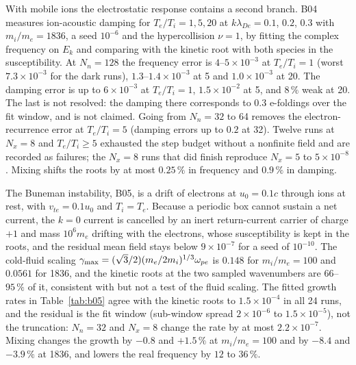 With mobile ions the electrostatic response contains a second branch. B04 measures ion-acoustic damping for $T_e/T_i=1,5,20$ at $k\lambda_{De}=0.1$, $0.2$, $0.3$ with $m_i/m_e=1836$, a seed $10^{-6}$ and the hypercollision $\nu=1$, by fitting the complex frequency on $E_k$ and comparing with the kinetic root with both species in the susceptibility. At $N_n=128$ the frequency error is $4$--$5\times10^{-3}$ at $T_e/T_i=1$ (worst $7.3\times10^{-3}$ for the dark runs), $1.3$--$1.4\times10^{-3}$ at 5 and $1.0\times10^{-3}$ at 20. The damping error is up to $6\times10^{-3}$ at $T_e/T_i=1$, $1.5\times10^{-2}$ at 5, and $8\,\%$ weak at 20. The last is not resolved: the damping there corresponds to 0.3 e-foldings over the fit window, and is not claimed. Going from $N_n=32$ to 64 removes the electron-recurrence error at $T_e/T_i=5$ (damping errors up to $0.2$ at 32). Twelve runs at $N_x=8$ and $T_e/T_i\ge5$ exhausted the step budget without a nonfinite field and are recorded as failures; the $N_x=8$ runs that did finish reproduce $N_x=5$ to $5\times10^{-8}$. Mixing shifts the roots by at most $0.25\,\%$ in frequency and $0.9\,\%$ in damping.

The Buneman instability, B05, is a drift of electrons at $u_0=0.1c$ through ions at rest, with $v_{te}=0.1u_0$ and $T_i=T_e$. Because a periodic box cannot sustain a net current, the $k=0$ current is cancelled by an inert return-current carrier of charge $+1$ and mass $10^6m_e$ drifting with the electrons, whose susceptibility is kept in the roots, and the residual mean field stays below $9\times10^{-7}$ for a seed of $10^{-10}$. The cold-fluid scaling $\gamma_{\max}=(\sqrt3/2)(m_e/2m_i)^{1/3}\omega_{pe}$ is $0.148$ for $m_i/m_e=100$ and $0.0561$ for 1836, and the kinetic roots at the two sampled wavenumbers are $66$--$95\,\%$ of it, consistent with but not a test of the fluid scaling. The fitted growth rates in Table~\ref{tab:b05} agree with the kinetic roots to $1.5\times10^{-4}$ in all 24 runs, and the residual is the fit window (sub-window spread $2\times10^{-6}$ to $1.5\times10^{-5}$), not the truncation: $N_n=32$ and $N_x=8$ change the rate by at most $2.2\times10^{-7}$. Mixing changes the growth by $-0.8$ and $+1.5\,\%$ at $m_i/m_e=100$ and by $-8.4$ and $-3.9\,\%$ at 1836, and lowers the real frequency by $12$ to $36\,\%$.

